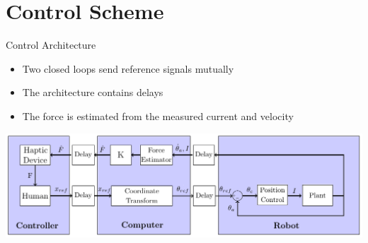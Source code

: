 \section{Control Scheme}

\begin{frame}{Control Architecture}{}
  \begin{itemize}
    \item Two closed loops send reference signals mutually
    \item The architecture contains delays
    \item The force is estimated from the measured current and velocity
    \end{itemize}
    \includegraphics[width=\textwidth]{Billeder/Dan/control.pdf}
\end{frame}
